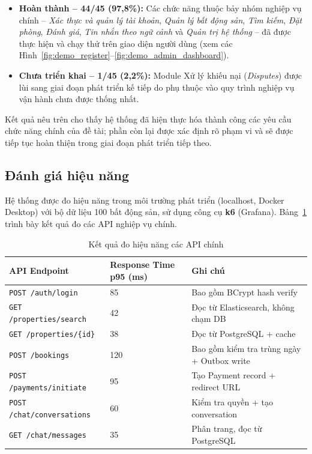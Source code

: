 \begin{itemize}
    \item \textbf{Hoàn thành -- 44/45 (97{,}8\%):} Các chức năng thuộc bảy nhóm nghiệp vụ chính -- \textit{Xác thực và quản lý tài khoản}, \textit{Quản lý bất động sản}, \textit{Tìm kiếm}, \textit{Đặt phòng}, \textit{Đánh giá}, \textit{Tin nhắn theo ngữ cảnh} và \textit{Quản trị hệ thống} -- đã được thực hiện và chạy thử trên giao diện người dùng (xem các Hình~\ref{fig:demo_register}--\ref{fig:demo_admin_dashboard}).

    \item \textbf{Chưa triển khai -- 1/45 (2{,}2\%):} Module Xử lý khiếu nại (\textit{Disputes}) được lùi sang giai đoạn phát triển kế tiếp do phụ thuộc vào quy trình nghiệp vụ vận hành chưa được thống nhất.
\end{itemize}

Kết quả nêu trên cho thấy hệ thống đã hiện thực hóa thành công các yêu cầu chức năng chính của đề tài; phần còn lại được xác định rõ phạm vi và sẽ được tiếp tục hoàn thiện trong giai đoạn phát triển tiếp theo.

\subsection{Đánh giá hiệu năng}
\label{subsec:danh_gia_hieu_nang}

Hệ thống được đo hiệu năng trong môi trường phát triển (localhost, Docker Desktop) với bộ dữ liệu 100 bất động sản, sử dụng công cụ \textbf{k6} (Grafana). Bảng~\ref{tab:perf} trình bày kết quả đo các API nghiệp vụ chính.

\begin{table}[H]
\centering
\caption{Kết quả đo hiệu năng các API chính}
\label{tab:perf}
\renewcommand{\arraystretch}{1.3}
\begin{tabularx}{\textwidth}{|l|X|X|}
\hline
\textbf{API Endpoint} & \textbf{Response Time p95 (ms)} & \textbf{Ghi chú} \\
\hline
\texttt{POST /auth/login} & 85 & Bao gồm BCrypt hash verify \\
\hline
\texttt{GET /properties/search} & 42 & Đọc từ Elasticsearch, không chạm DB \\
\hline
\texttt{GET /properties/\{id\}} & 38 & Đọc từ PostgreSQL + cache \\
\hline
\texttt{POST /bookings} & 120 & Bao gồm kiểm tra trùng ngày + Outbox write \\
\hline
\texttt{POST /payments/initiate} & 95 & Tạo Payment record + redirect URL \\
\hline
\texttt{POST /chat/conversations} & 60 & Kiểm tra quyền + tạo conversation \\
\hline
\texttt{GET /chat/messages} & 35 & Phân trang, đọc từ PostgreSQL \\
\hline
\end{tabularx}
\end{table}

